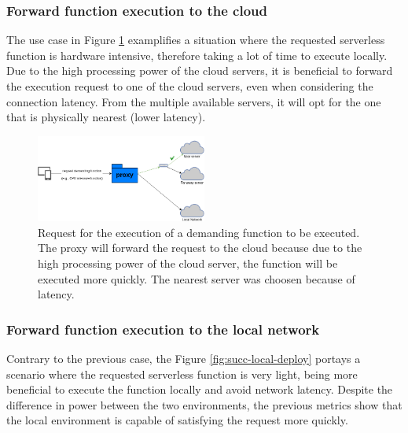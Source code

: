 \documentclass[conference]{IEEEtran}
\begin{document}
\subsubsection{Forward function execution to the cloud} \label{usecases:forward_cloud}

The use case in Figure \ref{fig:succ-cloud-deploy} examplifies a situation where
the requested serverless function is hardware intensive, therefore taking a lot of
time to execute locally. Due to the high processing power of the cloud servers, it
is beneficial to forward the execution request to one of the cloud servers, even
when considering the connection latency. From the multiple available servers, it
will opt for the one that is physically nearest (lower latency).

\begin{figure}[ht]
  \begin{center}
    \includegraphics[width=0.5\textwidth]{diss-succ-cloud-deploy.png}
    \caption{Request for the execution of a demanding function to be executed. The
    proxy will forward the request to the cloud because due to the high processing
    power of the cloud server, the function will be executed more quickly. The nearest
    server was choosen because of latency.}
    \label{fig:succ-cloud-deploy}
  \end{center}
\end{figure}

\subsubsection{Forward function execution to the local network}
\label{usecases:forward_local}

Contrary to the previous case, the Figure \ref{fig:succ-local-deploy} portays a
scenario where the requested serverless function is very light, being more
beneficial to execute the function locally and avoid network latency. Despite the
difference in power between the two environments, the previous metrics show that
the local environment is capable of satisfying the request more quickly.
\end{document}
